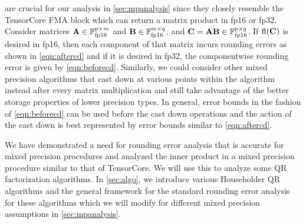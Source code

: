 

 are crucial for our analysis in \cref{sec:mpanalysis} since they closely resemble the TensorCore FMA block which can return a matrix product in fp16 or fp32. 
Consider matrices $\mathbf{A}\in\mathbb{F}_{\text{fp16}}^{p\times m}$ and $\mathbf{B}\in\mathbb{F}_{\text{fp16}}^{m\times q}$, and $\mathbf{C}=\mathbf{A}\mathbf{B}\in\mathbb{F}_{\text{fp16}}^{p\times q}$.
If $\mathrm{fl}(\mathbf{C})$ is desired in fp16, then each component of that matrix incurs rounding errors as shown in \cref{eqn:aftercd} and if it is desired in fp32, the componentwise rounding error is given by \cref{eqn:beforecd}.
Similarly, we could consider other mixed precision algorithms that cast down at various points within the algorithm instead after every matrix multiplication and still take advantage of the better storage properties of lower precision types. 
In general, error bounds in the fashion of \cref{eqn:beforecd} can be used before the cast down operations and the action of the cast down is best represented by error bounds similar to \cref{eqn:aftercd}.\par

We have demonstrated a need for rounding error analysis that is accurate for mixed precision procedures and analyzed the inner product in a mixed precision procedure similar to that of TensorCore.
We will use this to analyze some QR factorization algorithms.
In \cref{sec:algo}, we introduce various Householder QR algorithms and the general framework for the standard rounding error analysis for these algorithms which we will modify for different mixed precision assumptions in \cref{sec:mpanalysis}.